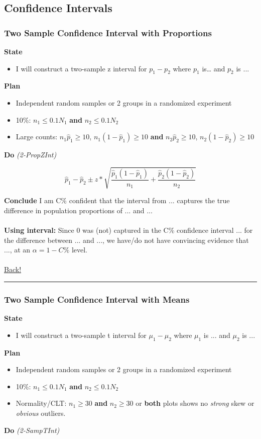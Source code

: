 \documentclass[main]{subfiles}
\begin{document}

\subsection{Confidence Intervals}
\subsubsection{Two Sample Confidence Interval with Proportions}
\textbf{State}
\begin{itemize}
    \item I will construct a two-sample z interval for $p_1 - p_2$ where $p_1$ is… and $p_2$ is ...
\end{itemize}
\textbf{Plan}
\begin{itemize}
    \item Independent random samples or 2 groups in a randomized experiment
    \item 10\%: $n_1 \leq 0.1N_1$ \textbf{and} $n_2 \leq 0.1N_2$
    \item Large counts: $n_1\hat{p}_1 \geq 10$, $n_1(1-\hat{p}_1) \geq 10$ \textbf{and} $n_2\hat{p}_2 \geq 10$, $n_2(1-\hat{p}_2) \geq 10$
\end{itemize}
\textbf{Do} \textit{(2-PropZInt)}

\[\hat{p}_1-\hat{p}_2 \pm z* \sqrt{\frac{\hat{p}_1(1-\hat{p}_1)}{n_1} + \frac{\hat{p}_2(1-\hat{p}_2)}{n_2}}\]

\noindent\textbf{Conclude}
I am C\% confident that the interval from ... captures the true difference in population proportions of ... and ...
\\~\\
\noindent\textbf{Using interval:} Since 0 was (not) captured in the C\% confidence interval ... for the difference between ... and ..., we have/do not have convincing evidence that ..., at an $\alpha = 1 - C\%$ level.
\\~\\
\noindent\hyperlink{toc}{Back!}
\newline\hrule


\subsubsection{Two Sample Confidence Interval with Means}
\textbf{State}
\begin{itemize}
    \item I will construct a two-sample t interval for $\mu_1 - \mu_2$ where $\mu_1$ is ... and $\mu_2$ is ...
\end{itemize}
\textbf{Plan}
\begin{itemize}
    \item Independent random samples or 2 groups in a randomized experiment
    \item 10\%: $n_1 \leq 0.1N_1$ \textbf{and} $n_2 \leq 0.1N_2$
    \item Normality/CLT: $n_1 \geq 30$ \textbf{and} $n_2 \geq 30$ or \textbf{both} plots shows no \textit{strong} skew or \textit{obvious} outliers.
\end{itemize}
\textbf{Do} \textit{(2-SampTInt)}
\end{document}
